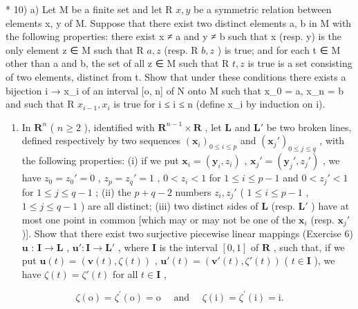 * 10) a) Let M be a finite set and let R \(x, y\) be a symmetric relation between elements x, y of M. Suppose that there exist two distinct elements a, b in M with the following properties: there exist x ≠ a and y ≠ b such that x (resp. y) is the only element z ∈ M such that R \(a, z\) (resp. R \(b, z\) ) is true; and for each t ∈ M other than a and b, the set of all z ∈ M such that R \(t, z\) is true is a set consisting of two elements, distinct from t. Show that under these conditions there exists a bijection i → x\_i of an interval {[}o, n{]} of N onto M such that x\_0 = a, x\_n = b and such that R \(x_{i-1}, x_i\) is true for i ≤ i ≤ n (define x\_i by induction on i).

\begin{enumerate}
\def\labelenumi{\alph{enumi})}
\setcounter{enumi}{1}
\tightlist
\item
  In \(\mathbf{R}^n\) ( \(n \geqslant 2\) ), identified with \(\mathbf{R}^{n-1} \times \mathbf{R}\) , let \(\mathbf{L}\) and \(\mathbf{L}'\) be two broken lines, defined respectively by two sequences \((\boldsymbol{x}_i)_{0 \leqslant i \leqslant p}\) and \((\boldsymbol{x}_j')_{0 \leqslant j \leqslant q}\) , with the following properties: (i) if we put \(\boldsymbol{x}_i = (\boldsymbol{y}_i, z_i)\) , \(\boldsymbol{x}_j' = (\boldsymbol{y}_j', z_j')\) , we have \(z_0 = z_0' = 0\) , \(z_p = z_q' = 1\) , \(0 < z_i < 1\) for \(1 \leqslant i \leqslant p - 1\) and \(0 < z_j' < 1\) for \(1 \leqslant j \leqslant q - 1\) ; (ii) the \(p + q - 2\) numbers \(z_i, z_j'\) ( \(1 \leqslant i \leqslant p - 1\) , \(1 \leqslant j \leqslant q - 1\) ) are all distinct; (iii) two distinct sides of \(\mathbf{L}\) (resp. \(\mathbf{L}'\) ) have at most one point in common {[}which may or may not be one of the \(\boldsymbol{x}_i\) (resp. \(\boldsymbol{x}_j'\) ){]}. Show that there exist two surjective piecewise linear mappings (Exercise 6) \(\boldsymbol{u}\) : \(\mathbf{I} \to \mathbf{L}\) , \(\boldsymbol{u}'\colon \mathbf{I} \to \mathbf{L}'\) , where \(\mathbf{I}\) is the interval \([0, 1]\) of \(\mathbf{R}\) , such that, if we put \(\boldsymbol{u}(t) = (\boldsymbol{v}(t), \zeta(t))\) , \(\boldsymbol{u}'(t) = (\boldsymbol{v}'(t), \zeta'(t))\) ( \(t \in \mathbf{I}\) ), we have \(\zeta(t) = \zeta'(t)\) for all \(t \in \mathbf{I}\) ,
\end{enumerate}

\[
\zeta (\mathrm{o}) = \zeta^ {\prime} (\mathrm{o}) = \mathrm{o} \quad \text { and } \quad \zeta (\mathrm{i}) = \zeta^ {\prime} (\mathrm{i}) = \mathrm{i}.
\]

